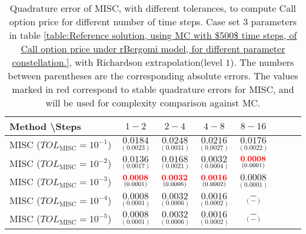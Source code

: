 \begin{table}[h!]
	\centering
	\begin{tabular}{l*{6}{c}r}
		Method \textbackslash  Steps            & $1-2$ & $2-4$ & $4-8$ & $8-16$  \\
		\hline
		MISC ($TOL_{\text{MISC}}=10^{-1}$) & $\underset{(0.0023)}{\mathbf{    0.0184
		}}$  & $\underset{( 0.0031)}{\mathbf{ 0.0248}}$   & $\underset{(   0.0027)}{\mathbf{  0.0216}}$ & $\underset{(  0.0022)}{\mathbf{  0.0176}}$  \\ 
		MISC ($TOL_{\text{MISC}}=10^{-2}$)   & $\underset{(    0.0017
			)}{\mathbf{  0.0136}}$  & $\underset{(
			0.0021)}{\mathbf{   0.0168}}$  & $\underset{(0.0004)}{\mathbf{   0.0032
		}}$  & $\underset{(0.0001)}{\mathbf{{\color{red}0.0008}}}$  \\ 
		MISC ($TOL_{\text{MISC}}=10^{-3}$)  & $\underset{(0.0001)}{\mathbf{{\color{red}0.0008}}}$  & $\underset{(0.0006)}{\mathbf{  {\color{red}0.0032}}}$   & $\underset{(0.0002)}{\mathbf{    {\color{red}0.0016}}}$  &  $\underset{(0.0001)}{\mathbf{0.0008}}$  \\ 
		
		MISC ($TOL_{\text{MISC}}=10^{-4}$)  & $\underset{(0.0001)}{\mathbf{0.0008}}$  & $\underset{(0.0006)}{\mathbf{ 0.0032}}$   & $\underset{(0.0002)}{\mathbf{   0.0016}}$ & $\underset{(-)}{\mathbf{-}}$  \\
		
		MISC ($TOL_{\text{MISC}}=10^{-5}$)    &  $\underset{(0.0001)}{\mathbf{0.0008}}$ & $\underset{(0.0006)}{\mathbf{  0.0032}}$   & $\underset{(0.0002)}{\mathbf{    0.0016}}$ & $\underset{(-)}{\mathbf{-}}$  \\
		
		\hline
	\end{tabular}
	\caption{Quadrature error of MISC, with different tolerances, to compute Call option price  for different number of time steps. Case set $3$ parameters in table \ref{table:Reference solution, using MC with $500$ time steps, of Call option price under rBergomi model, for different parameter constellation.}, with Richardson extrapolation(level $1$). The numbers between parentheses are the corresponding absolute errors. The values marked in red correspond to stable quadrature errors for MISC, and will be used for complexity comparison against MC.}
	\label{Quadrature error of MISC to compute Call option price of the different tolerances for different number of time steps. Case set $3$ parameters, with Richardson extrapolation(level $1$). The numbers between parentheses are the corresponding absolute errors.}
\end{table}




